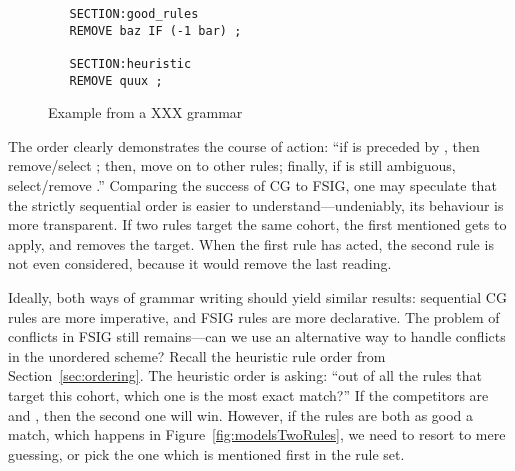 \begin{figure}
\centering
   \begin{verbatim}
   SECTION:good_rules
   REMOVE baz IF (-1 bar) ;

   SECTION:heuristic   
   REMOVE quux ;
   \end{verbatim}
\label{fig:ruleOrder}
\caption{Example from a XXX grammar}
\end{figure}

The order clearly demonstrates the course of action: ``if  is preceded by , then remove/select ; then, move on to other rules; finally, if  is still ambiguous, select/remove .'' 
Comparing the success of CG to FSIG, one may speculate that the strictly sequential order is easier to understand---undeniably, its behaviour is more transparent. %
If two rules target the same cohort, the first mentioned gets to apply, and removes the target. When the first rule has acted, the second rule is not even considered, because it would remove the last reading.

Ideally, both ways of grammar writing should yield similar results:
sequential CG rules are more imperative, and FSIG rules are more declarative.
The problem of conflicts in FSIG still remains---can we use an alternative way to handle conflicts in the unordered scheme?
%
%
Recall the heuristic rule order from Section~\ref{sec:ordering}. The heuristic order is asking: ``out of all the rules that target this cohort, which one is the most exact match?'' If the competitors are  and , then the second one will win. However, if the rules are both as good a match, which happens in Figure~\ref{fig:modelsTwoRules}, we need to resort to mere guessing, or pick the one which is mentioned first in the rule set.

